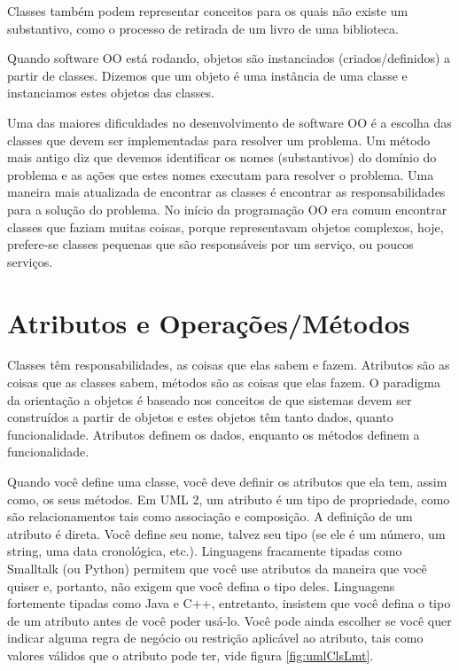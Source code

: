 Classes também podem representar conceitos para os quais não existe um substantivo, como o processo de retirada de um livro de uma biblioteca.

Quando software OO está rodando, objetos são instanciados (criados/definidos) a partir de classes. Dizemos que um objeto é uma instância de uma classe e instanciamos estes objetos das classes.

Uma das maiores dificuldades no desenvolvimento de software OO é a escolha das classes que devem ser implementadas para resolver um problema. Um método mais antigo diz que devemos identificar os nomes (substantivos) do domínio do problema e as ações que  estes nomes executam para resolver o problema. Uma maneira mais atualizada de encontrar as classes é encontrar as responsabilidades para a solução do problema. No início da programação OO era comum encontrar classes que faziam muitas coisas, porque representavam objetos complexos, hoje, prefere-se classes pequenas que são responsáveis por um serviço, ou poucos serviços.

\section{Atributos e Operações/Métodos}

Classes têm responsabilidades, as coisas que elas sabem e fazem. Atributos são as coisas que as classes sabem, métodos são as coisas que elas fazem. O paradigma da orientação a objetos é baseado nos conceitos de que sistemas devem ser construídos a partir de objetos e estes objetos têm tanto dados, quanto funcionalidade. Atributos definem os dados, enquanto os métodos definem a funcionalidade.

Quando você define uma classe, você deve definir os atributos que ela tem, assim como, os seus métodos. Em UML 2, um atributo é um tipo de propriedade, como são relacionamentos tais como associação e composição. A definição de um atributo é direta. Você define seu nome, talvez seu tipo (se ele é um número, um string, uma data cronológica, etc.).  Linguagens fracamente tipadas como Smalltalk (ou Python) permitem que você use atributos da maneira que você quiser e, portanto, não exigem que você defina o tipo deles. Linguagens fortemente tipadas como Java e C++, entretanto, insistem que você defina o tipo de um atributo antes de você poder usá-lo. Você pode ainda escolher se você quer indicar alguma regra de negócio ou restrição aplicável ao atributo, tais como valores válidos que o atributo pode ter, vide figura \ref{fig:umlClsLmt}.

